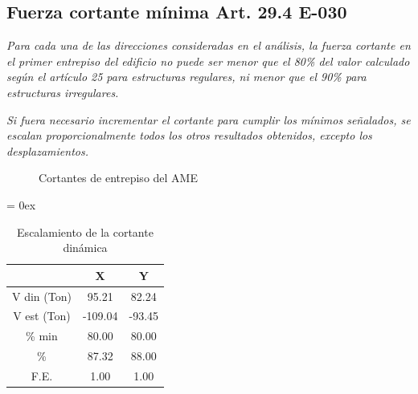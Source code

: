 \documentclass{article}%
\begin{document}
%
\subsection{Fuerza cortante mínima Art. 29.4 E{-}030}%
\label{subsec:FuerzacortantemnimaArt.29.4E{-}030}%
\begin{tcolorbox}[colback=gray!5!white,colframe=cyan!75!black,fonttitle=\bfseries,title=Art. 29.4.1]%
\textit{Para cada una de las direcciones consideradas en el análisis, la fuerza cortante en el primer entrepiso del edificio no puede ser menor que el 80\% del valor calculado según el artículo 25 para estructuras regulares, ni menor que el 90\% para estructuras irregulares.}%
\end{tcolorbox}%
\begin{tcolorbox}[colback=gray!5!white,colframe=cyan!75!black,fonttitle=\bfseries,title=Art. 29.4.2]%
\textit{Si fuera necesario incrementar el cortante para cumplir los mínimos señalados,  se escalan proporcionalmente todos los otros resultados obtenidos, excepto los  desplazamientos.}%
\end{tcolorbox}%


\begin{figure}[ht!]%
\caption{Cortantes de entrepiso del AME}%
\label{fig:corte_basal}%
\end{figure}

%


\begin{table}[h!]%
\centering%
\caption{Escalamiento de la cortante dinámica}%
\extrarowheight = 0ex%
\renewcommand{\arraystretch}{1.2}%
\begin{tabular}{ccc}
\toprule
 & X & Y \\
\midrule
V din (Ton) & 95.21 & 82.24 \\
V est (Ton) & -109.04 & -93.45 \\
\% min & 80.00 & 80.00 \\
\% & 87.32 & 88.00 \\
F.E. & 1.00 & 1.00 \\
\bottomrule
\end{tabular}
%
\end{table}

%
\end{document}
